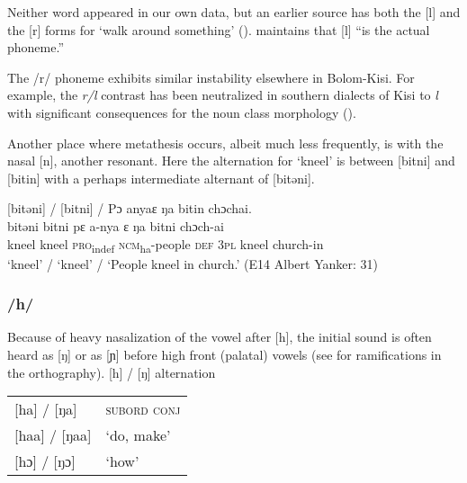 Neither word appeared in our own data, but an earlier source has both the [l] and the [r] forms for ‘walk around something' (\citealt{Pichl1967}). \citet{Hanson1979a} maintains that [l] “is the actual phoneme.”

The /r/ phoneme exhibits similar instability elsewhere in Bolom-Kisi. For example, the \textit{r/l} contrast has been neutralized in southern dialects of Kisi to \textit{l} with significant consequences for the noun class morphology (\citealt{Childs1983}).

Another place where metathesis occurs, albeit much less frequently, is with the nasal [n], another resonant. Here the alternation for ‘kneel' is between [bitni] and [bitin] with a perhaps intermediate alternant of [bitəni].


\ea%
\label{ex:25}
[bitəni] / [bitni] / Pɔ anyaɛ ŋa bitin chɔchai.\\
\gll bitəni    bitni    pɛ      a-nya        ɛ    ŋa    bitni    chɔch-ai\\
kneel    kneel    \textsc{pro}\textsubscript{indef}   \textsc{ncm}\textsubscript{ha}{}-people  \textsc{def}  \textsc{3pl}  kneel    church-in\\
\glt ‘kneel' / ‘kneel' / ‘People kneel in church.' (E14 Albert Yanker: 31)\footnotemark 
{}
\z

\subsubsection{/h/}
\label{sec:2.1.2.7}
Because of heavy nasalization of the vowel after [h], the initial sound is often heard as [ŋ] or as [ɲ] before high front (palatal) vowels (see  for ramifications in the orthography).
\clearpage
\ea%
\label{ex:26}{[h] / [ŋ] alternation}\\
\vspace{6pt}
\begin{tabular}[t]{ll}
 [ha] / [ŋa]    &  \textsc{subord} \textsc{conj}\\
 {[haa]} / [ŋaa]     & ‘do, make'\\
 {[hɔ]}\footnotemark{} / [ŋɔ] & ‘how'\\
\end{tabular}
\z

